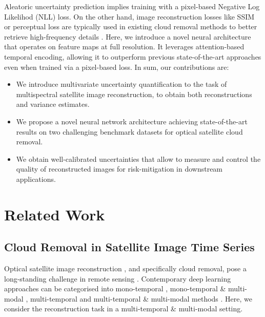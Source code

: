\documentclass[10pt,twocolumn,letterpaper]{article}
\begin{document}
Aleatoric uncertainty prediction implies training with a pixel-based Negative Log Likelihod (NLL) loss.
On the other hand, image reconstruction losses like SSIM or perceptual loss are typically used in existing cloud removal methods to better retrieve high-frequency details \cite{ebel2020multisensor, wang2022hybrid, darbaghshahi22}. Here, we introduce a novel neural architecture that operates on feature maps at full resolution. It leverages attention-based temporal encoding, allowing it to outperform previous state-of-the-art approaches even when trained via a pixel-based loss.
In sum, our contributions are: 
\begin{itemize}
    \item We introduce multivariate uncertainty quantification to the task of multispectral satellite image reconstruction, to obtain both reconstructions and variance estimates. 
    \item We propose a novel neural network architecture achieving state-of-the-art results on two challenging benchmark datasets for optical satellite cloud removal.
    \item We obtain well-calibrated uncertainties that allow to measure and control the quality of reconstructed images for risk-mitigation in downstream applications.
\end{itemize}



\section{Related Work}
\subsection{Cloud Removal in Satellite Image Time Series}
\label{sec:related:CR}
Optical satellite image reconstruction \cite{shen2015missing}, and specifically cloud removal, pose a long-standing challenge in remote sensing \cite{lin2012cloud, eckardt2013removal, li2014recovering, hu2015thin, huang2015sar}. Contemporary deep learning approaches can be categorised into mono-temporal \cite{Enomoto_Sakurada_Wang_Fukui_Matsuoka_Nakamura_Kawaguchi_2017, Bermudez_Happ_Oliveira_Feitosa_2018, gao2020cloud, pan2020cloud, xu2022glf}, mono-temporal \& multi-modal \cite{grohnfeldt2018conditional, meraner2020cloud, ebel2020multisensor}, multi-temporal \cite{Sarukkai_Jain_Uzkent_Ermon_2019} and multi-temporal \& multi-modal methods \cite{ebel2022sen12ms, sebastianelli2022plfm}. Here, we consider the reconstruction task in a multi-temporal \& multi-modal setting.
\end{document}
